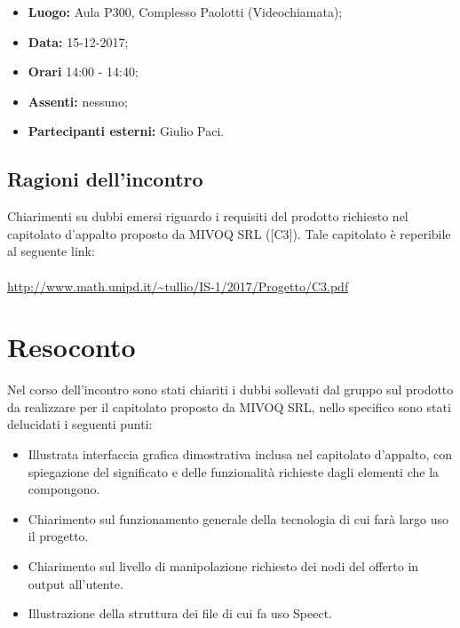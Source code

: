 \documentclass[openany,12pt,a4paper]{article}
\begin{document}
	\begin{itemize} 
	    \item \textbf{Luogo:} Aula P300, Complesso Paolotti (Videochiamata);
	    \item \textbf{Data:} 15-12-2017;
	    \item \textbf{Orari} 14:00 - 14:40;
	    \item \textbf{Assenti:} nessuno;
	    \item \textbf{Partecipanti esterni:} Giulio Paci.
	\end{itemize}
	
	\subsection{Ragioni dell'incontro}
	
	Chiarimenti su dubbi emersi riguardo i requisiti del prodotto richiesto nel capitolato d'appalto proposto da MIVOQ SRL ([C3]). Tale capitolato è reperibile al seguente link:
	\\ 
	\\ \url{http://www.math.unipd.it/~tullio/IS-1/2017/Progetto/C3.pdf}
	
	\section{Resoconto}
	
	Nel corso dell'incontro sono stati chiariti i dubbi sollevati dal gruppo sul prodotto da realizzare per il capitolato proposto da MIVOQ SRL, nello specifico sono stati delucidati i seguenti punti:
	
	\begin{itemize}
	    \item Illustrata interfaccia grafica dimostrativa inclusa nel capitolato d'appalto, con spiegazione del significato e delle funzionalità richieste dagli elementi che la compongono.
	    \item Chiarimento sul funzionamento generale della tecnologia  di cui farà largo uso il progetto.
	    \item Chiarimento sul livello di manipolazione richiesto dei nodi del  offerto in output all'utente.
	    \item Illustrazione della struttura dei file  di cui fa uso Speect.
	\end{itemize}
	
	
	
	
\end{document}
